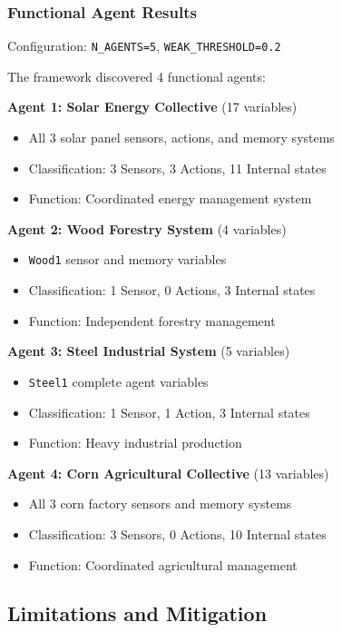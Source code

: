 \documentclass[10pt,conference]{IEEEtran}
\begin{document}
\subsubsection{Functional Agent Results}
Configuration: \texttt{N\_AGENTS=5}, \texttt{WEAK\_THRESHOLD=0.2}

The framework discovered 4 functional agents:

\textbf{Agent 1: Solar Energy Collective} (17 variables)
\begin{itemize}
  \item All 3 solar panel sensors, actions, and memory systems
  \item Classification: 3 Sensors, 3 Actions, 11 Internal states
  \item Function: Coordinated energy management system
\end{itemize}

\textbf{Agent 2: Wood Forestry System} (4 variables)  
\begin{itemize}
  \item \texttt{Wood1} sensor and memory variables
  \item Classification: 1 Sensor, 0 Actions, 3 Internal states
  \item Function: Independent forestry management
\end{itemize}

\textbf{Agent 3: Steel Industrial System} (5 variables)
\begin{itemize}
  \item \texttt{Steel1} complete agent variables  
  \item Classification: 1 Sensor, 1 Action, 3 Internal states
  \item Function: Heavy industrial production
\end{itemize}

\textbf{Agent 4: Corn Agricultural Collective} (13 variables)
\begin{itemize}
  \item All 3 corn factory sensors and memory systems
  \item Classification: 3 Sensors, 0 Actions, 10 Internal states  
  \item Function: Coordinated agricultural management
\end{itemize}

\subsection{Limitations and Mitigation}
\end{document}
